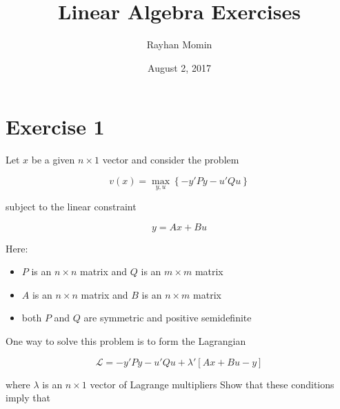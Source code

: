 \documentclass[10pt,letter]{article}
\begin{document}


\title{Linear Algebra Exercises}

\author{Rayhan Momin}

\date{August 2, 2017}
 
\maketitle 

\section*{Exercise 1}

\begin{flushleft}
Let $x$ be a given $n \times 1$ vector and consider the problem
\end{flushleft}

\[v(x) =  \max_{y,u} \left\{ - y'P y - u' Q u \right\}\]

\begin{flushleft}
subject to the linear constraint

\end{flushleft}
\[y = Ax + Bu\]

\begin{flushleft}
Here: 
\end{flushleft}

\begin{itemize}
  \item $P$ is an $n \times n$ matrix and $Q$ is an $m \times m$ matrix
  \item $A$ is an $n \times n$ matrix and $B$ is an $n \times m$ matrix
  \item both $P$ and $Q$ are symmetric and positive semidefinite
\end{itemize}

\begin{flushleft}
One way to solve this problem is to form the Lagrangian
\end{flushleft}

\[\mathcal L = - y' P y - u' Q u + \lambda' \left[A x + B u - y\right]\]

\begin{flushleft}
where $\lambda$ is an $n \times 1$ vector of Lagrange multipliers
\newline
Show that these conditions imply that
\end{flushleft}
\end{document}

